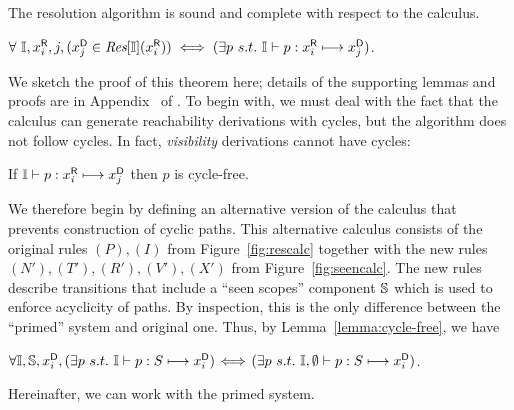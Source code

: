 The resolution algorithm is sound and complete
with respect to the calculus. 
\begin{theorem}
\label{theorem:correctness}
$\forall\ \mathbb{I}, {x}^{\mbox{\scriptsize\sf R}}_{i}, j, ({x}^{\mbox{\scriptsize\sf D}}_{j}\in \mbox{\it{Res}}[\mathbb{I}]({x}^{\mbox{\scriptsize\sf R}}_{i})) 
\iff (\exists p\ s.t.\ \mathbb{I} \vdash p : {x}^{\mbox{\scriptsize\sf R}}_{i} \longmapsto {x}^{\mbox{\scriptsize\sf D}}_{j})$.
\end{theorem}

We sketch the proof of this theorem here; 
details of the supporting lemmas and proofs are in Appendix  ~of
\cite{TUD-SERG-2015-001-local}.
To begin with, we must deal with the fact that the calculus can
generate reachability derivations with cycles,
but the algorithm does not follow cycles.
In fact, \emph{visibility} derivations cannot have cycles: 

\begin{lemma}%
\label{lemma:cycle-free}
If $\mathbb{I} \vdash p : {x}^{\mbox{\scriptsize\sf R}}_{i} \longmapsto {x}^{\mbox{\scriptsize\sf D}}_{j}$ then $p$ is cycle-free.
\end{lemma}



\noindent
We therefore begin 
by defining an alternative version of the calculus that
prevents construction of cyclic paths.  This alternative calculus 
consists of the original rules $(P),(I)$ from Figure~\ref{fig:rescalc} 
together with the new rules $(N'),(T'),(R'),(V'),(X')$ 
from Figure~\ref{fig:seencalc}.
The new rules describe transitions that include a ``seen scopes'' component $\mathbb{S}$ which
is used to enforce acyclicity of paths. By inspection, this is the only difference 
between the ``primed'' system and original one.
Thus, by Lemma~\ref{lemma:cycle-free}, we have

\begin{lemma}
\label{lemma:primed}
$\forall\seeni, \seens, \di{x}{i}, (\exists p\ s.t.\ \seeni \vdash p:S \resolve
\di{x}{i})\!\iff\!(\exists p\ s.t.\ \seeni,\emptyset \vdash p:S \resolve \di{x}{i})$.
\end{lemma}

\noindent
Hereinafter, we can work with the primed system.

